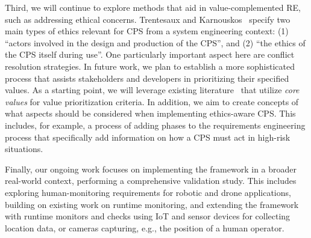 Third, we will continue to explore methods that aid in value-complemented RE, such as addressing ethical concerns. %
Trentesaux and Karnouskos~\cite{trentesaux2020Ethical} specify two main types of ethics relevant for CPS from a system engineering context: (1) \enquote{actors involved in the design and production of the CPS}, and (2) \enquote{the ethics of the CPS itself during use}. %
One particularly important aspect here are conflict resolution strategies. In future work, we plan to establish a more sophisticated process that assists stakeholders and developers in prioritizing their specified values. As a starting point, we will leverage existing literature~\cite{noauthor2021ieee,Spiekermann2023Value} that utilize \textit{core values} for value prioritization criteria.
In addition, we aim to create concepts of what aspects should be considered when implementing ethics-aware CPS. This includes, for example, a process of adding phases to the requirements engineering process that specifically add information on how a CPS must act in high-risk situations. 

Finally, our ongoing work focuses on implementing the framework in a broader  real-world context, performing a comprehensive validation study. This includes exploring human-monitoring requirements for robotic and drone  applications, building on existing work on runtime monitoring, %
and extending the framework with runtime monitors and checks using IoT and sensor devices for collecting location data, or cameras capturing, e.g., the position of a human operator.



% 




